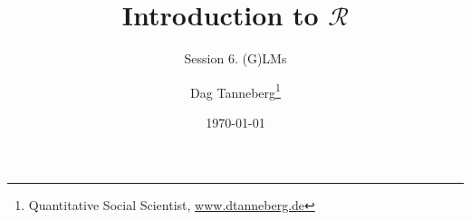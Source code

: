 \usepackage[utf8]{inputenc}
\usepackage{hyperref}
\usepackage{graphicx}
\usepackage{booktabs}
\usepackage{multirow}

\title{Introduction to $\mathcal{R}$}
\subtitle{Session 6. (G)LMs}
\author{Dag Tanneberg\thanks{%
    Quantitative Social Scientist, %
    \href{http://www.dtanneberg.de}{www.dtanneberg.de}
    }
}
\date{\today}
\hypersetup{colorlinks, urlcolor = red, linkcolor = }

